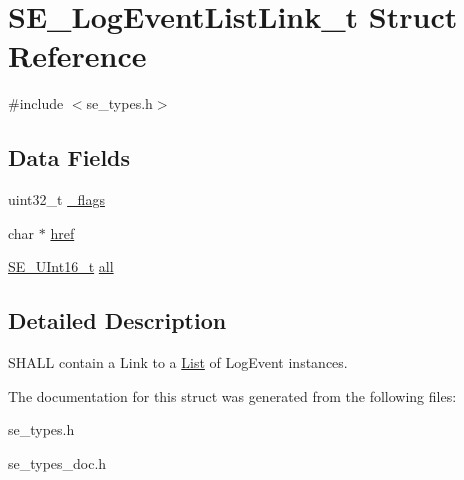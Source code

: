 \hypertarget{structSE__LogEventListLink__t}{}\section{S\+E\+\_\+\+Log\+Event\+List\+Link\+\_\+t Struct Reference}
\label{structSE__LogEventListLink__t}


{\ttfamily \#include $<$se\+\_\+types.\+h$>$}

\subsection*{Data Fields}
\begin{DoxyCompactItemize}
\item 
uint32\+\_\+t \hyperlink{group__LogEventListLink_gaa16e99e978e2b29da0be8ebc6f6996e4}{\+\_\+flags}
\item 
char $\ast$ \hyperlink{group__LogEventListLink_ga24433e460b3ce5e3caec2498cb0c16e2}{href}
\item 
\hyperlink{group__UInt16_gac68d541f189538bfd30cfaa712d20d29}{S\+E\+\_\+\+U\+Int16\+\_\+t} \hyperlink{group__LogEventListLink_ga76f053623ed84ac7494426cdfa5b3cfe}{all}
\end{DoxyCompactItemize}


\subsection{Detailed Description}
S\+H\+A\+LL contain a Link to a \hyperlink{structList}{List} of Log\+Event instances. 

The documentation for this struct was generated from the following files\+:\begin{DoxyCompactItemize}
\item 
se\+\_\+types.\+h\item 
se\+\_\+types\+\_\+doc.\+h\end{DoxyCompactItemize}
